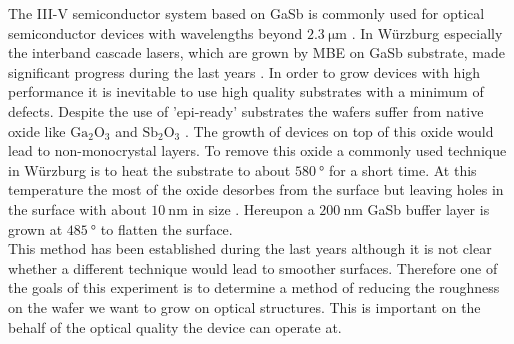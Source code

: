\label{motivation}
The III-V semiconductor system based on GaSb is commonly used for optical 
semiconductor devices with wavelengths beyond $\SI{2.3}{\micro\meter}$ 
\cite{arafin}. In Würzburg especially the interband cascade lasers, which are 
grown by MBE on GaSb substrate, made significant progress during the last years 
\cite{weih}. In order to grow devices with high performance it is inevitable to 
use high quality substrates with a minimum of defects. Despite the use of 
'epi-ready' substrates the wafers suffer from native oxide like $\mathrm{Ga}_2 
\mathrm{O}_3$ and $\mathrm{Sb}_2 \mathrm{O}_3$ \cite{vineis}. The growth of 
devices on top of this oxide would lead to non-monocrystal layers. To remove 
this oxide a commonly used technique in Würzburg is to heat the substrate to 
about $\SI{580}{\degree}$ for a short time. At this temperature the most of the 
oxide desorbes from the surface but leaving holes in the surface with about  
$\SI{10}{\nano\meter}$ in size \cite{murray}. Hereupon a $\SI{200}{\nano\meter}$ 
GaSb buffer layer is grown at $\SI{485}{\degree}$ to flatten the surface. \\  
This method has been established during the last years although it is not clear 
whether a different technique would lead to smoother surfaces. Therefore one of 
the goals of this experiment is to determine a method of reducing the roughness 
on the wafer we want to grow on optical structures. This is important on the 
behalf of the optical quality the device can operate at.

